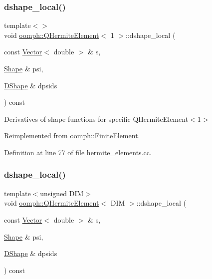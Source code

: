 \subsubsection{\texorpdfstring{dshape\+\_\+local()}{dshape\_local()}\hspace{0.1cm}{\footnotesize\ttfamily [1/3]}}
{\footnotesize\ttfamily template$<$$>$ \\
void \hyperlink{classoomph_1_1QHermiteElement}{oomph\+::\+Q\+Hermite\+Element}$<$ 1 $>$\+::dshape\+\_\+local (\begin{DoxyParamCaption}\item[{const \hyperlink{classoomph_1_1Vector}{Vector}$<$ double $>$ \&}]{s,  }\item[{\hyperlink{classoomph_1_1Shape}{Shape} \&}]{psi,  }\item[{\hyperlink{classoomph_1_1DShape}{D\+Shape} \&}]{dpsids }\end{DoxyParamCaption}) const\hspace{0.3cm}{\ttfamily [virtual]}}



Derivatives of shape functions for specific Q\+Hermite\+Element$<$1$>$ 



Reimplemented from \hyperlink{classoomph_1_1FiniteElement_a9db1456b827131c21a991ac9fedf4b0c}{oomph\+::\+Finite\+Element}.



Definition at line 77 of file hermite\+\_\+elements.\+cc.

\mbox{\label{classoomph_1_1QHermiteElement_a8b44fee3bf2a9d1b7587b56e434b594e}} 
\subsubsection{\texorpdfstring{dshape\+\_\+local()}{dshape\_local()}\hspace{0.1cm}{\footnotesize\ttfamily [2/3]}}
{\footnotesize\ttfamily template$<$unsigned D\+IM$>$ \\
void \hyperlink{classoomph_1_1QHermiteElement}{oomph\+::\+Q\+Hermite\+Element}$<$ D\+IM $>$\+::dshape\+\_\+local (\begin{DoxyParamCaption}\item[{const \hyperlink{classoomph_1_1Vector}{Vector}$<$ double $>$ \&}]{s,  }\item[{\hyperlink{classoomph_1_1Shape}{Shape} \&}]{psi,  }\item[{\hyperlink{classoomph_1_1DShape}{D\+Shape} \&}]{dpsids }\end{DoxyParamCaption}) const\hspace{0.3cm}{\ttfamily [virtual]}}



